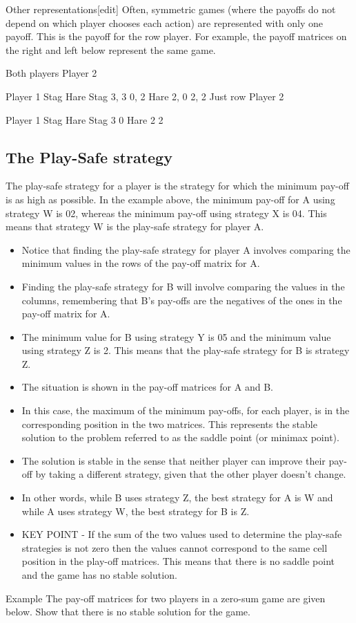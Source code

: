 \documentclass[]{report}
\begin{document}
Other representations[edit]
Often, symmetric games (where the payoffs do not depend on which player chooses each action) are represented with only one payoff. This is the payoff for the row player. For example, the payoff matrices on the right and left below represent the same game.

Both players
Player 2

Player 1
Stag	Hare
Stag	3, 3	0, 2
Hare	2, 0	2, 2
Just row
Player 2

Player 1
Stag	Hare
Stag	3	0
Hare	2	2


\newpage
\subsection{The Play-Safe strategy}
The play-safe strategy for a player is the strategy for which the minimum pay-off is as high as possible. In the example above, the minimum pay-off for A using strategy W is 02, whereas the minimum pay-off using strategy X is 04. This means that strategy W is the play-safe strategy for player A.

\begin{itemize}
\item Notice that finding the play-safe strategy for player A involves comparing the minimum values in the rows of the pay-off matrix for A.
\item 
Finding the play-safe strategy for B will involve comparing the values in the columns, remembering that B’s pay-offs are the negatives of the ones in the pay-off matrix for A.
\item 
The minimum value for B using strategy Y is 05 and the minimum value using strategy Z is 2. This means that the play-safe strategy for B is strategy Z.
\item 
The situation is shown in the pay-off matrices for A and B.
\item

In this case, the maximum of the minimum pay-offs, for each player, is in the corresponding position in the two matrices. This represents the stable solution to the problem referred to as the saddle point (or minimax point).
\item 
The solution is stable in the sense that neither player can improve their pay-off by taking a different strategy, given that the other player doesn’t change.
\item
In other words, while B uses strategy Z, the best strategy for A is W and while A uses strategy W, the best strategy for B is Z.
\item
KEY POINT - If the sum of the two values used to determine the play-safe strategies is not zero then the values cannot correspond to the same cell position in the play-off matrices. This means that there is no saddle point and the game has no stable solution.
\end{itemize}
Example
The pay-off matrices for two players in a zero-sum game are given below. Show that there is no stable solution for the game.
\end{document}
